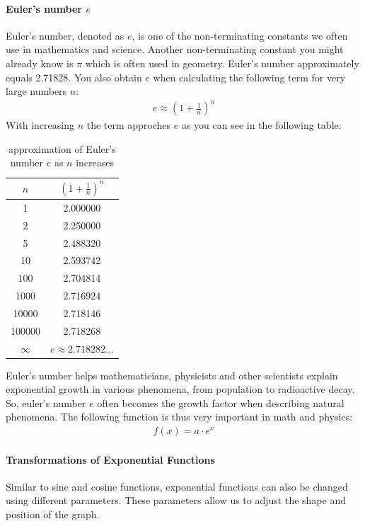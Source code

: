 \paragraph{Euler's number $e$}
Euler's number, denoted as $e$, is one of the non-terminating constants we often use in mathematics and science. Another non-terminating constant you might already know is $\pi$ which is often used in geometry.
Euler’s number approximately equals 2.71828. You also obtain $e$ when calculating the following term for very large numbers $n$: 
\begin{align}
    e \approx  \left( 1+ \frac{1}{n} \right)^n
\end{align}
With increasing $n$ the term approches $e$ as you can see in the following table: 
\begin{table}[h]
\centering
\begin{tabular}{|c|c|}
\hline
$n$ & $\left(1 + \frac{1}{n}\right)^n$ \\
\hline
1      & 2{.}000000 \\
2      & 2{.}250000 \\
5      & 2{.}488320 \\
10     & 2{.}593742 \\
100    & 2{.}704814 \\
1000   & 2{.}716924 \\
10000  & 2{.}718146 \\
100000 & 2{.}718268 \\
\hline
$\infty$ & $e \approx 2{.}718282\ldots$ \\
\hline
\end{tabular}
\caption{approximation of Euler's number $e$ as $n$ increases}
\label{tab:euler}
\end{table}
Euler’s number helps mathematicians, physicists and other scientists explain exponential growth in various phenomena, from population to radioactive decay. So, euler's number $e$ often becomes the growth factor when describing natural phenomena. The following function is thus very important in math and physics: 
\begin{align}
    f(x) = a \cdot e^x
\end{align}




\paragraph{Transformations of Exponential Functions}

Similar to sine and cosine functions, exponential functions can also be changed using different parameters. These parameters allow us to adjust the shape and position of the graph.

